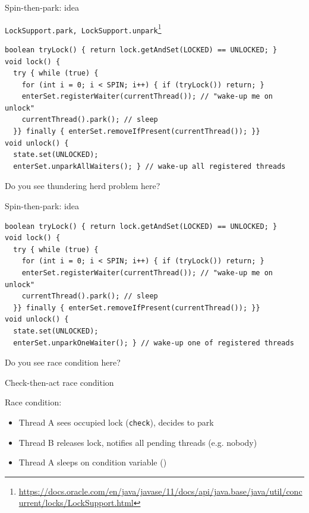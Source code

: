 
\begin{frame}[fragile]{Spin-then-park: idea}

\texttt{LockSupport.park, LockSupport.unpark}\footnote{\tiny\url{https://docs.oracle.com/en/java/javase/11/docs/api/java.base/java/util/concurrent/locks/LockSupport.html}}

\begin{verbatim}
boolean tryLock() { return lock.getAndSet(LOCKED) == UNLOCKED; }
void lock() {
  try { while (true) { 
    for (int i = 0; i < SPIN; i++) { if (tryLock()) return; }    
    enterSet.registerWaiter(currentThread()); // "wake-up me on unlock"
    currentThread().park(); // sleep 
  }} finally { enterSet.removeIfPresent(currentThread()); }}
void unlock() { 
  state.set(UNLOCKED); 
  enterSet.unparkAllWaiters(); } // wake-up all registered threads
\end{verbatim}

\pause
Do you see thundering herd problem here?

\end{frame}

\begin{frame}[fragile]{Spin-then-park: idea}

\begin{verbatim}
boolean tryLock() { return lock.getAndSet(LOCKED) == UNLOCKED; }
void lock() {
  try { while (true) { 
    for (int i = 0; i < SPIN; i++) { if (tryLock()) return; }    
    enterSet.registerWaiter(currentThread()); // "wake-up me on unlock"
    currentThread().park(); // sleep 
  }} finally { enterSet.removeIfPresent(currentThread()); }}
void unlock() { 
  state.set(UNLOCKED); 
  enterSet.unparkOneWaiter(); } // wake-up one of registered threads
\end{verbatim}

\pause 
Do you see race condition here?

\end{frame}


\begin{frame}{Check-then-act race condition}

Race condition: 
\begin{itemize}
 \item Thread A sees occupied lock (\texttt{check}), decides to park
 \item Thread B releases lock, notifies all pending threads (e.g. nobody)
 \item Thread A sleeps on condition variable ()
\end{itemize}

\end{frame}

